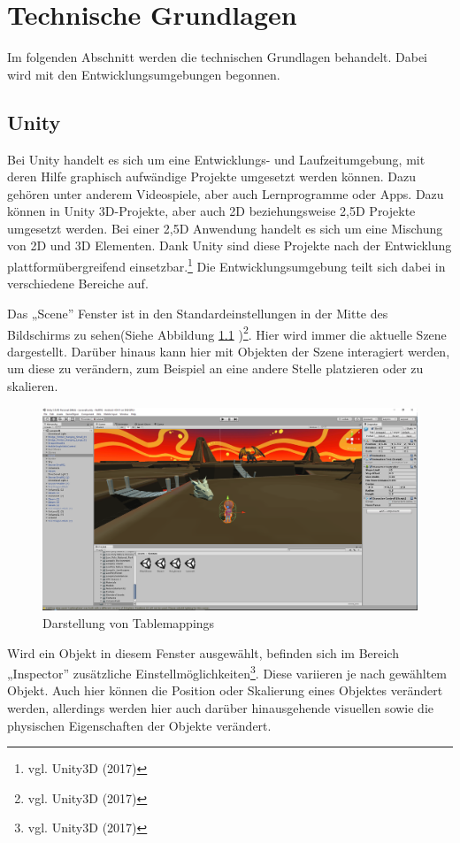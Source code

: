 \chapter{Technische Grundlagen}
	Im folgenden Abschnitt werden die technischen Grundlagen behandelt. Dabei wird mit den Entwicklungsumgebungen begonnen.

\section{Unity}
	Bei Unity handelt es sich um eine Entwicklungs- und Laufzeitumgebung, mit deren Hilfe graphisch aufwändige Projekte umgesetzt werden können. Dazu gehören unter anderem Videospiele, aber auch Lernprogramme oder Apps. Dazu können in Unity 3D-Projekte, aber auch 2D beziehungsweise 2,5D Projekte umgesetzt werden. Bei einer 2,5D Anwendung handelt es sich um eine Mischung von 2D und 3D Elementen. Dank Unity sind diese Projekte nach der Entwicklung plattformübergreifend einsetzbar.\footnote{vgl. Unity3D \cite{unity1} (2017)} Die Entwicklungsumgebung teilt sich dabei in verschiedene Bereiche auf. 

	Das „Scene” Fenster ist in den Standardeinstellungen in der Mitte des Bildschirms zu sehen(Siehe Abbildung \ref{scene} )\footnote{vgl. Unity3D \cite{unity2} (2017)}. Hier wird immer die aktuelle Szene dargestellt. Darüber hinaus kann hier mit Objekten der Szene interagiert werden, um diese zu verändern, zum Beispiel an eine andere Stelle platzieren oder zu skalieren.

	\begin{figure}[htbp]
		\centering 
		\label{scene}
		\includegraphics[width=\textwidth]{pics/unity3d_ui.png}
		\caption{Darstellung von Tablemappings}
	\end{figure}

	Wird ein Objekt in diesem Fenster ausgewählt, befinden sich im Bereich „Inspector” zusätzliche Einstellmöglichkeiten\footnote{vgl. Unity3D \cite{unity3} (2017)}. Diese variieren je nach gewähltem Objekt. Auch hier können die Position oder Skalierung eines Objektes verändert werden, allerdings werden hier auch darüber hinausgehende visuellen sowie die physischen Eigenschaften der Objekte verändert.


